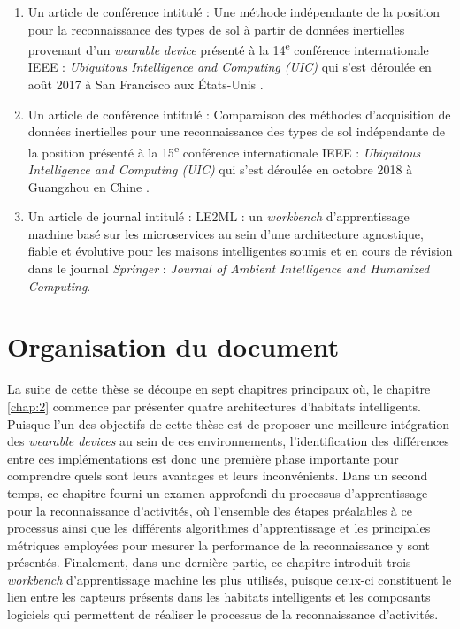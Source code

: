 {{\begin{enumerate}
	\item
		\label{pub:1}
		Un article de conférence intitulé : \og Une méthode indépendante de la position pour la reconnaissance des types de sol à partir de données inertielles provenant d'un \textit{wearable device} \fg présenté à la 14\textsuperscript{e} conférence internationale IEEE : \textit{Ubiquitous Intelligence and Computing (UIC)} qui s'est déroulée en août 2017 à San Francisco aux États-Unis \citep{Thullier2017}.
	\item
		\label{pub:2}
		Un article de conférence intitulé : \og Comparaison des méthodes d'acquisition de données inertielles pour une reconnaissance des types de sol indépendante de la position \fg présenté à la 15\textsuperscript{e} conférence internationale IEEE : \textit{Ubiquitous Intelligence and Computing (UIC)} qui s'est déroulée en octobre 2018 à Guangzhou en Chine \citep{Thullier2018}.
	\item
		\label{pub:3}
		Un article de journal intitulé : \og LE2ML : un \textit{workbench} d'apprentissage machine basé sur les microservices au sein d'une architecture agnostique, fiable et évolutive pour les maisons intelligentes \fg soumis et en cours de révision dans le journal \textit{Springer} : \textit{Journal of Ambient Intelligence and Humanized Computing}.
\end{enumerate}

\section{Organisation du document}

La suite de cette thèse se découpe en sept chapitres principaux où, le chapitre \ref{chap:2} commence par présenter quatre architectures d'habitats intelligents. Puisque l'un des objectifs de cette thèse est de proposer une meilleure intégration des \textit{wearable devices} au sein de ces environnements, l'identification des différences entre ces implémentations est donc une première phase importante pour comprendre quels sont leurs avantages et leurs inconvénients. Dans un second temps, ce chapitre fourni un examen approfondi du processus d'apprentissage pour la reconnaissance d'activités, où l'ensemble des étapes préalables à ce processus ainsi que les différents algorithmes d'apprentissage et les principales métriques employées pour mesurer la performance de la reconnaissance y sont présentés. Finalement, dans une dernière partie, ce chapitre introduit trois \textit{workbench} d'apprentissage machine les plus utilisés, puisque ceux-ci constituent le lien entre les capteurs présents dans les habitats intelligents et les composants logiciels qui permettent de réaliser le processus de la reconnaissance d'activités.

}}
